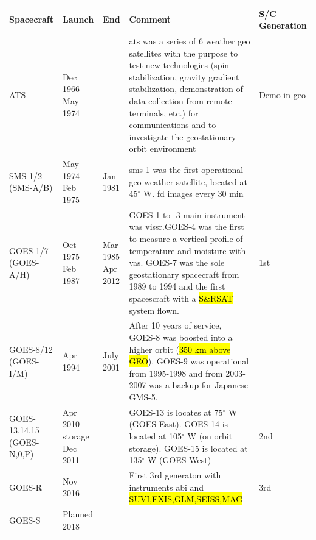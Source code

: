 \documentclass{article}
\makeatletter
\renewenvironment{table}
     {\@float{table} \small}
     {\end@float}
\def\deg{$^\circ$\xspace}
\makeatother
\begin{document}
\begin{table}
\center
\caption{\ac{goes} Family. Source: \url{https://directory.eoportal.org/web/eoportal/satellite-missions/g/goes-2nd-generation}}
\label{tb:goes}
\begin{tabularx}{\textwidth}{L{0.7}L{0.6}L{0.6}L{2.6}L{0.5}}
\toprule
Spacecraft & Launch & End & Comment & S/C Generation \\
\midrule 
ATS & Dec 1966 \newline May 1974 &  & \ac{ats} was a series of 6 weather \ac{geo} satellites 
with the purpose to test new technologies (spin stabilization, gravity gradient stabilization, demonstration of data collection from remote terminals, etc.) for communications and to investigate the geostationary orbit environment & Demo in \ac{geo} \\
\hline
SMS-1/2 \newline (SMS-A/B) & May 1974 \newline Feb 1975 & Jan 1981 & \ac{sms-1} was the first operational \ac{geo} weather satellite, located at 45\deg W. \ac{fd} images every 30 min & \\
\midrule
GOES-1/7 \newline  (GOES-A/H) & Oct 1975 \newline Feb 1987 & Mar 1985 \newline Apr 2012 & GOES-1 to -3 main instrument was \ac{vissr}.\newline GOES-4 was the first to measure a vertical profile of temperature and moisture with \ac{vas}. \newline GOES-7 was the sole geostationary spacecraft from 1989 to 1994 and the first spacescraft with a \hl{S\&RSAT} system flown. & 1st \\ 
\midrule
GOES-8/12 \newline (GOES-I/M) & Apr 1994 \newline & July 2001 &  After 10 years of service, GOES-8 was boosted into a higher orbit (\hl{350 km above GEO}). \newline GOES-9 was operational from 1995-1998 and from 2003-2007 was a backup for Japanese GMS-5. & \\
\midrule
GOES-13,14,15 \newline (GOES-N,0,P) & Apr 2010 \newline storage  \newline Dec 2011 & & GOES-13 is locates at 75\deg W (GOES East). \newline GOES-14 is located at 105\deg W (on orbit storage). \newline GOES-15 is located at 135\deg W  (GOES West) & 2nd \\
\midrule
GOES-R & Nov 2016 &  & First 3rd generaton with instruments \ac{abi} and \hl{SUVI,EXIS,GLM,SEISS,MAG} & 3rd \\
\midrule
GOES-S & Planned 2018 & & & \\
\bottomrule
\end{tabularx}
\end{table}
\end{document}
